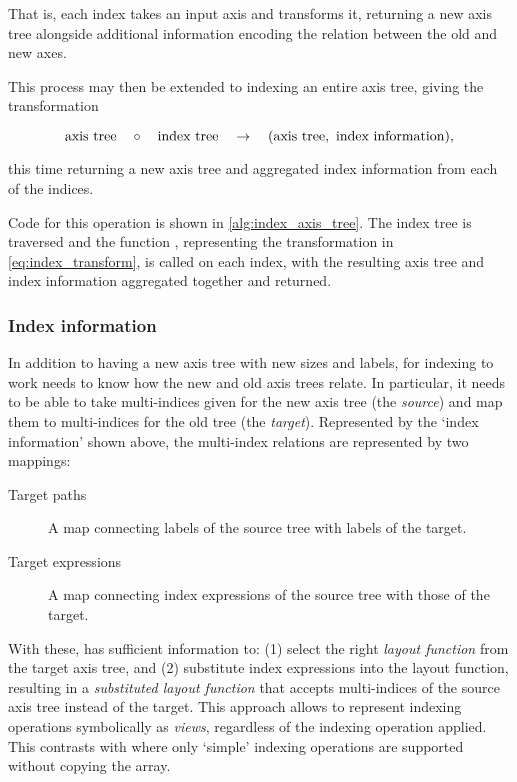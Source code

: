 \documentclass[thesis]{subfiles}
\begin{document}
\noindent
That is, each index takes an input axis and transforms it, returning a new axis tree alongside additional information encoding the relation between the old and new axes.

This process may then be extended to indexing an entire axis tree, giving the transformation

\begin{equation*}
  \textnormal{axis tree} \quad \circ \quad \textnormal{index tree} \quad \to \quad (\textnormal{axis tree},\ \textnormal{index information}),
\end{equation*}

\noindent
this time returning a new axis tree and aggregated index information from each of the indices.

Code for this operation is shown in \cref{alg:index_axis_tree}.
The index tree is traversed and the function , representing the transformation in \cref{eq:index_transform}, is called on each index, with the resulting axis tree and index information aggregated together and returned.

\subsubsection{Index information}

In addition to having a new axis tree with new sizes and labels, for indexing to work  needs to know how the new and old axis trees relate.
In particular, it needs to be able to take multi-indices given for the new axis tree (the \emph{source}) and map them to multi-indices for the old tree (the \emph{target}).
Represented by the `index information' shown above, the multi-index relations are represented by two mappings:

\begin{description}
  \item[Target paths] A map connecting labels of the source tree with labels of the target.
  \item[Target expressions] A map connecting index expressions of the source tree with those of the target.
\end{description}

With these,  has sufficient information to:
(1) select the right \emph{layout function} from the target axis tree, and
(2) substitute index expressions into the layout function, resulting in a \emph{substituted layout function} that accepts multi-indices of the source axis tree instead of the target.
This approach allows  to represent indexing operations symbolically as \emph{views}, regardless of the indexing operation applied.
This contrasts with \numpy where only `simple' indexing operations are supported without copying the array.
\end{document}
